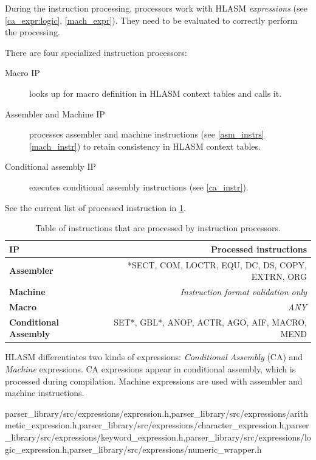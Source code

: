 During the instruction processing, processors work with HLASM \emph{expressions} (see \cref{ca_expr:logic}, \cref{mach_expr}). They need to be evaluated to correctly perform the processing.

There are four specialized instruction processors:
\begin{description}
	\item[Macro IP] looks up for macro definition in HLASM context tables and calls it.
	\item[Assembler and Machine IP] processes assembler and machine instructions (see \cref{asm_instrs} \cref{mach_instr}) to retain consistency in HLASM context tables.
	\item[Conditional assembly IP] executes conditional assembly instructions (see \cref{ca_instr}). 
	
\end{description}

See the current list of processed instruction in \cref{tab06:instr_proc}.

\begin{table}
	\centering
	\begin{tabular}{lr}
		\textbf{IP}                   &                  \textbf{Processed instructions} \\ \toprule
		\textbf{Assembler}            & *SECT, COM, LOCTR, EQU, DC, DS, COPY, EXTRN, ORG \\
		\textbf{Machine}              &        \emph{Instruction format validation only} \\
		\textbf{Macro}                &                                       \emph{ANY} \\
		\textbf{Conditional Assembly} &    SET*, GBL*, ANOP, ACTR, AGO, AIF, MACRO, MEND \\ \bottomrule
	\end{tabular}
	\caption{Table of instructions that are processed by instruction processors.}
	\label{tab06:instr_proc}
\end{table}

\vspace{0.5cm}

HLASM differentiates two kinds of expressions: \emph{Conditional Assembly} (CA) and \emph{Machine} expressions. CA expressions appear in conditional assembly, which is processed during compilation. Machine expressions are used with assembler and machine instructions.

{parser\_library/src/expressions/expression.h,parser\_library/src/expressions/arithmetic\_expression.h,parser\_library/src/expressions/character\_expression.h,parser\_library/src/expressions/keyword\_expression.h,parser\_library/src/expressions/logic\_expression.h,parser\_library/src/expressions/numeric\_wrapper.h}
\label{ca_expr:logic}

